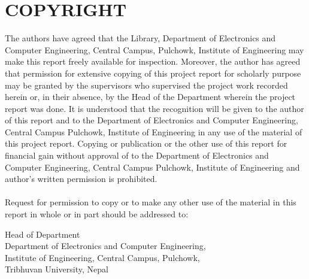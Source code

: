 \section*{COPYRIGHT}
\justify 
The authors have agreed that the Library, Department of Electronics and Computer
Engineering, Central Campus, Pulchowk, Institute of Engineering may make this report
freely available for inspection. Moreover, the author has agreed that permission for extensive
copying of this project report for scholarly purpose may be granted by the supervisors who
supervised the project work recorded herein or, in their absence, by the Head of the
Department wherein the project report was done. It is understood that the recognition will
be given to the author of this report and to the Department of Electronics and Computer
Engineering, Central Campus Pulchowk, Institute of Engineering in any use of the material
of this project report. Copying or publication or the other use of this report for financial gain
without approval of to the Department of Electronics and Computer Engineering, Central
Campus Pulchowk, Institute of Engineering and author’s written permission is prohibited.\\
\\
Request for permission to copy or to make any other use of the material in this report in
whole or in part should be addressed to:\\[2cm]
\begin{flushleft}
Head of Department\\
Department of Electronics and Computer Engineering,\\
Institute of Engineering, Central Campus, Pulchowk,\\
Tribhuvan University, Nepal\\
\end{flushleft}